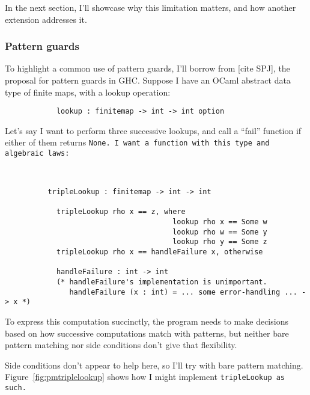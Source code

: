 \documentclass[manuscript,screen,review, 12pt, nonacm]{acmart}
\begin{document}
\begin{outline}[enumerate]
    In the next section, I'll showcase why this limitation matters, and how
    another extension addresses it. 

    \subsubsection{Pattern guards}
    \label{guards}

    To highlight a common use of pattern guards, I'll borrow from [cite SPJ],
    the proposal for pattern guards in GHC. Suppose I have an OCaml abstract
    data type of finite maps, with a lookup operation: 

    \begin{minipage}[t]{\textwidth}
        \centering 
        \begin{verbatim}
            lookup : finitemap -> int -> int option
        \end{verbatim}
    \end{minipage}
    
    Let's say I want to perform three successive lookups, and call a “fail”
    function if either of them returns \tt{None}. I want a function with 
    this type and algebraic laws: 

    \begin{minipage}[t]{\textwidth}
        \centering 
        \begin{verbatim}
          

          tripleLookup : finitemap -> int -> int

            tripleLookup rho x == z, where 
                                       lookup rho x == Some w
                                       lookup rho w == Some y
                                       lookup rho y == Some z
            tripleLookup rho x == handleFailure x, otherwise
            
            handleFailure : int -> int 
            (* handleFailure's implementation is unimportant.
               handleFailure (x : int) = ... some error-handling ... -> x *)  

        \end{verbatim}
    \end{minipage}

    To express this computation succinctly, the program needs to make decisions
    based on how successive computations match with patterns, but neither bare
    pattern matching nor side conditions don't give that flexibility. 
    
    Side conditions don't appear to help here, so I'll try with bare pattern
    matching. Figure~\ref{fig:pmtriplelookup} shows how I might implement
    \tt{tripleLookup} as such. 


\end{outline}
\end{document}
